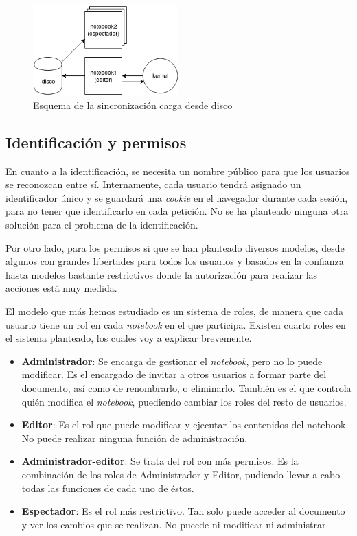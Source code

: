 \documentclass[11pt,spanish,listoffigures,listoftables]{tfgetsinf}
\begin{document}
\begin{figure}[h]
	\centering
  	\includegraphics[width=0.5\textwidth]{JSON-sync.png}
  	\caption{Esquema de la sincronización carga desde disco}
  	\label{fig:disk-scheme}
\end{figure}


\subsection{Identificación y permisos}
\label{subsec:identificacin-permisos}

En cuanto a la identificación, se necesita un nombre público para que los usuarios se reconozcan entre sí. Internamente, cada usuario tendrá asignado un identificador único y se guardará una \textit{cookie} en el navegador durante cada sesión, para no tener que identificarlo en cada petición. No se ha planteado ninguna otra solución para el problema de la identificación.

Por otro lado, para los permisos si que se han planteado diversos modelos, desde algunos con grandes libertades para todos los usuarios y basados en la confianza hasta modelos bastante restrictivos donde la autorización para realizar las acciones está muy medida.

El modelo que más hemos estudiado es un sistema de roles, de manera que cada usuario tiene un rol en cada \textit{notebook} en el que participa. Existen cuarto roles en el sistema planteado, los cuales voy a explicar brevemente.

\begin{itemize}

\item \textbf{Administrador}: Se encarga de gestionar el \textit{notebook}, pero no lo puede modificar. Es el encargado de invitar a otros usuarios a formar parte del documento, así como de renombrarlo, o eliminarlo. También es el que controla quién modifica el \textit{notebook}, puediendo cambiar los roles del resto de usuarios. 

\item \textbf{Editor}: Es el rol que puede modificar y ejecutar los contenidos del notebook. No puede realizar ninguna función de administración.

\item \textbf{Administrador-editor}: Se trata del rol con más permisos. Es la combinación de los roles de Administrador y Editor, pudiendo llevar a cabo todas las funciones de cada uno de éstos.

\item \textbf{Espectador}: Es el rol más restrictivo. Tan solo puede acceder al documento y ver los cambios que se realizan. No pueede ni modificar ni administrar.

\end{itemize}
\end{document}
